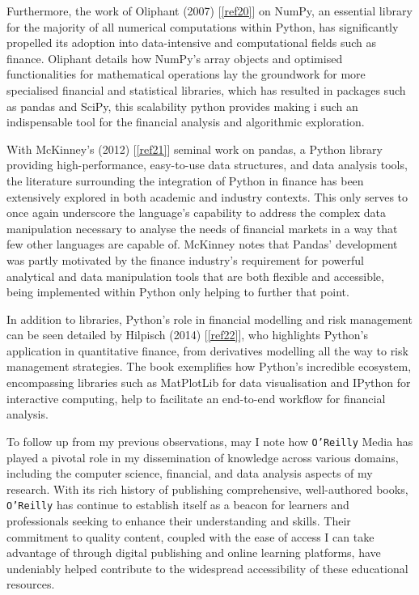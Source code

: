 \documentclass{article}
\begin{document}
Furthermore, the work of Oliphant (2007) [\ref{ref20}] on NumPy, an essential library for the majority of all numerical computations within Python, has significantly propelled its adoption into data-intensive and computational fields such as finance. Oliphant details how NumPy's array objects and optimised functionalities for mathematical operations lay the groundwork for more specialised financial and statistical libraries, which has resulted in packages such as pandas and SciPy, this scalability python provides making i such an indispensable tool for the financial analysis and algorithmic exploration.\\\vspace{0.3cm}

With McKinney's (2012) [\ref{ref21}] seminal work on pandas, a Python library providing high-performance, easy-to-use data structures, and data analysis tools, the literature surrounding the integration of Python in finance has been extensively explored in both academic and industry contexts. This only serves to once again underscore the language's capability to address the complex data manipulation necessary to analyse the needs of financial markets in a way that few other languages are capable of. McKinney notes that Pandas' development was partly motivated by the finance industry's requirement for powerful analytical and data manipulation tools that are both flexible and accessible, being implemented within Python only helping to further that point.\\\vspace{0.3cm}

In addition to libraries, Python's role in financial modelling and risk management can be seen detailed by Hilpisch (2014) [\ref{ref22}], who highlights Python's application in quantitative finance, from derivatives modelling all the way to risk management strategies. The book exemplifies how Python's incredible ecosystem, encompassing libraries such as MatPlotLib for data visualisation and IPython for interactive computing, help to facilitate an end-to-end workflow for financial analysis.\\\vspace{0.3cm}

To follow up from my previous observations, may I note how \texttt{O'Reilly} Media has played a pivotal role in my dissemination of knowledge across various domains, including the computer science, financial, and data analysis aspects of my research. With its rich history of publishing comprehensive, well-authored books, \texttt{O'Reilly} has continue to establish itself as a beacon for learners and professionals seeking to enhance their understanding and skills. Their commitment to quality content, coupled with the ease of access I can take advantage of through digital publishing and online learning platforms, have undeniably helped contribute to the widespread accessibility of these educational resources.\\\vspace{0.3cm}
\end{document}
